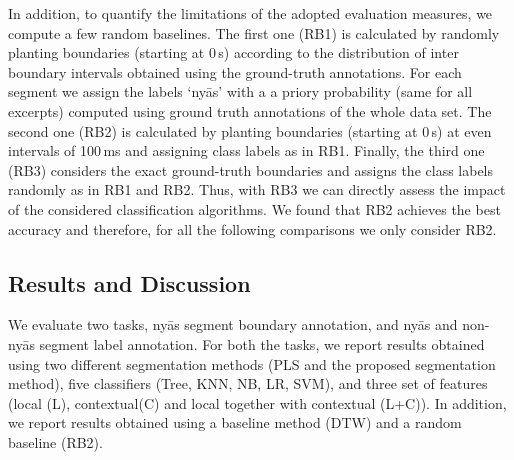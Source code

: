 In addition, to quantify the limitations of the adopted evaluation measures, we compute a few random baselines. The first one (RB1) is calculated by randomly planting boundaries (starting at 0\,s) according to the distribution of inter boundary intervals obtained using the ground-truth annotations. For each segment we assign the labels `ny\={a}s' with a a priory probability (same for all excerpts) computed using ground truth annotations of the whole data set. The second one (RB2) is calculated by planting boundaries (starting at 0\,s) at even intervals of 100\,ms and assigning class labels as in RB1. Finally, the third one (RB3) considers the exact ground-truth boundaries and assigns the class labels randomly as in RB1 and RB2. Thus, with RB3 we can directly assess the impact of the considered classification algorithms. We found that RB2 achieves the best accuracy and therefore, for all the following comparisons we only consider RB2.

%

\subsection{Results and Discussion}
\label{ResultsAndDiscussion}


We evaluate two tasks, ny\={a}s segment boundary annotation, and ny\={a}s and non-ny\={a}s segment label annotation. For both the tasks, we report results obtained using two different segmentation methods (PLS and the proposed segmentation method), five classifiers (Tree, KNN, NB, LR, SVM), and three set of features (local (L), contextual(C) and local together with contextual (L+C)). In addition, we report results obtained using a baseline method (DTW) and a random baseline (RB2).


